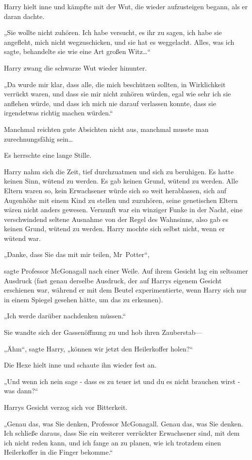 {Harry hielt inne und kämpfte mit der Wut, die wieder aufzusteigen begann, als er daran dachte.

„Sie wollte nicht zuhören. Ich habe versucht, es ihr zu sagen, ich habe sie angefleht, mich nicht wegzuschicken, und sie hat es weggelacht. Alles, was ich sagte, behandelte sie wie eine Art großen Witz…“

Harry zwang die schwarze Wut wieder hinunter.

„Da wurde mir klar, dass alle, die mich beschützen sollten, in Wirklichkeit verrückt waren, und dass sie mir nicht zuhören würden, egal wie sehr ich sie anflehen würde, und dass ich mich nie darauf verlassen konnte, dass sie irgendetwas richtig machen würden.“

Manchmal reichten gute Absichten nicht aus, manchmal musste man zurechnungsfähig sein…

Es herrschte eine lange Stille.

Harry nahm sich die Zeit, tief durchzuatmen und sich zu beruhigen. Es hatte keinen Sinn, wütend zu werden. Es gab keinen Grund, wütend zu werden. Alle Eltern waren so, kein Erwachsener würde sich so weit herablassen, sich auf Augenhöhe mit einem Kind zu stellen und zuzuhören, seine genetischen Eltern wären nicht anders gewesen. Vernunft war ein winziger Funke in der Nacht, eine verschwindend seltene Ausnahme von der Regel des Wahnsinns, also gab es keinen Grund, wütend zu werden. Harry mochte sich selbst nicht, wenn er wütend war.

„Danke, dass Sie das mit mir teilen, Mr~Potter“,

sagte Professor McGonagall nach einer Weile. Auf ihrem Gesicht lag ein seltsamer Ausdruck (fast genau derselbe Ausdruck, der auf Harrys eigenem Gesicht erschienen war, während er mit dem Beutel experimentierte, wenn Harry sich nur in einem Spiegel gesehen hätte, um das zu erkennen).

„Ich werde darüber nachdenken müssen.“

Sie wandte sich der Gassenöffnung zu und hob ihren Zauberstab—

„Ähm“, sagte Harry, „können wir jetzt den Heilerkoffer holen?“

Die Hexe hielt inne und schaute ihn wieder fest an.

„Und wenn ich nein sage - dass es zu teuer ist und du es nicht brauchen wirst - was dann?“

Harrys Gesicht verzog sich vor Bitterkeit.

„Genau das, was Sie denken, Professor McGonagall. Genau das, was Sie denken. Ich schließe daraus, dass Sie ein weiterer verrückter Erwachsener sind, mit dem ich nicht reden kann, und ich fange an zu planen, wie ich trotzdem einen Heilerkoffer in die Finger bekomme.“

}
